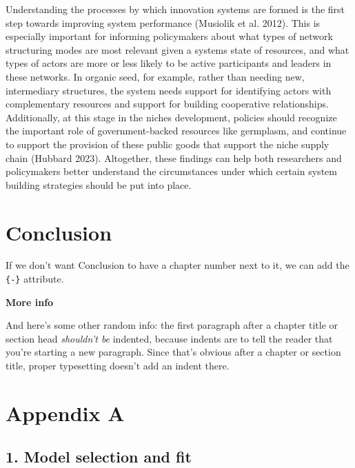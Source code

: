 \documentclass[twoside,12pt,final]{ucthesis-CA2012}
\begin{document}
\begin{ucmainmatter}
Understanding the processes by which innovation systems are formed is
the first step towards improving system performance (Musiolik et al.
2012). This is especially important for informing policymakers about
what types of network structuring modes are most relevant given a
system\textquotesingle s state of resources, and what types of actors are more or less
likely to be active participants and leaders in these networks. In
organic seed, for example, rather than needing new, intermediary
structures, the system needs support for identifying actors with
complementary resources and support for building cooperative
relationships. Additionally, at this stage in the niche\textquotesingle s development,
policies should recognize the important role of government-backed
resources like germplasm, and continue to support the provision of these
public goods that support the niche supply chain (Hubbard 2023).
Altogether, these findings can help both researchers and policymakers
better understand the circumstances under which certain system building
strategies should be put into place.

\hypertarget{conclusion-2}{%
\chapter*{Conclusion}\label{conclusion-2}}

If we don't want Conclusion to have a chapter number next to it, we can add the \texttt{\{-\}} attribute.

\textbf{More info}

And here's some other random info: the first paragraph after a chapter title or section head \emph{shouldn't be} indented, because indents are to tell the reader that you're starting a new paragraph. Since that's obvious after a chapter or section title, proper typesetting doesn't add an indent there.

\appendix

\hypertarget{appendix-a}{%
\chapter{Appendix A}\label{appendix-a}}

\hypertarget{model-selection-and-fit}{%
\section{1. Model selection and fit}\label{model-selection-and-fit}}
\begin{table}


\end{table}
\end{ucmainmatter}
\end{document}
